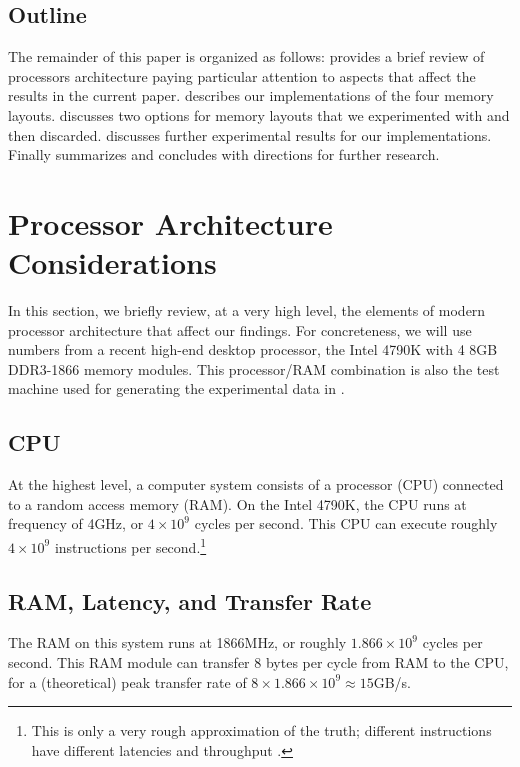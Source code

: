 \documentclass{patmorin}
\begin{document}
\subsection{Outline}

The remainder of this paper is organized as follows: 
provides a brief review of processors architecture paying particular
attention to aspects that affect the results in the current paper.
 describes our implementations of the four memory
layouts.  discusses two options for memory layouts
that we experimented with and then discarded.  
discusses further experimental results for our implementations.
Finally  summarizes and concludes with directions
for further research.

\section{Processor Architecture Considerations}

In this section, we briefly review, at a very high level, the elements of
modern processor architecture that affect our findings.  For concreteness,
we will use numbers from a recent high-end desktop processor, the
Intel 4790K \cite{intel:4790k} with 4 8GB DDR3-1866 memory modules.
This processor/RAM combination is also the test machine used for
generating the experimental data in .

\subsection{CPU}

At the highest level, a computer system consists of a processor (CPU)
connected to a random access memory (RAM). On the Intel 4790K, the
CPU runs at frequency of 4GHz, or $4\times10^9$ cycles per second.
This CPU can execute roughly $4\times 10^{9}$ instructions per
second.\footnote{This is only a very rough approximation of the
truth; different instructions have different latencies and throughput
\cite{granlund:instruction}.}



\subsection{RAM, Latency, and Transfer Rate}

The RAM on this system runs at 1866MHz, or roughly $1.866\times10^9$
cycles per second.  This RAM module can transfer 8 bytes per cycle
from RAM to the CPU, for a (theoretical) peak transfer rate of $8\times
1.866\times10^9\approx 15$GB/s.
\end{document}
